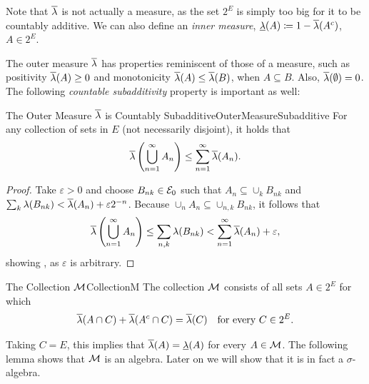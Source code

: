 Note that \(\overline{\lambda}\) is not actually a measure, as the set \(2^E\) is simply too big for it to be countably additive. We can also define an \textit{inner measure}, \(\underline{\lambda}(A) \coloneqq 1 - \overline{\lambda}(A^c)\), \(A \in 2^E\).

The outer measure \(\overline{\lambda}\) has properties reminiscent of those of a measure, such as positivity \(\overline{\lambda}(A) \ge 0\) and monotonicity \(\overline{\lambda}(A) \le \overline{\lambda}(B)\), when \(A \subseteq B\). Also, \(\overline{\lambda}(\emptyset) = 0\). The following \textit{countable subadditivity} property is important as well:

\begin{lem}{The Outer Measure \(\overline{\lambda}\) is Countably Subadditive}{OuterMeasureSubadditive}
	For any collection of sets in \(E\) (not necessarily disjoint), it holds that
	\begin{equation}
		\overline{\lambda}\left(\bigcup_{n=1}^\infty A_n\right) \le \sum_{n=1}^\infty \overline{\lambda}(A_n).
		\label{eq:OuterMeasureSubadditivity}
	\end{equation}
\end{lem}

\begin{proof}
	Take \(\varepsilon > 0\) and choose \(B_{nk} \in \mathcal{E}_0\) such that \(A_n \subseteq \cup_k B_{nk}\) and \(\sum_k \lambda(B_{nk}) < \overline{\lambda}(A_n) + \varepsilon 2^{-n}\). Because \(\cup_n A_n \subseteq \cup_{n,k} B_{nk}\), it follows that
	\begin{equation*}
		\overline{\lambda}\left(\bigcup_{n=1}^\infty A_n\right) \le \sum_{n,k} \lambda(B_{nk}) < \sum_{n=1}^\infty \overline{\lambda}(A_n) + \varepsilon,
	\end{equation*}
	showing , as \(\varepsilon\) is arbitrary.
\end{proof}

\begin{defn}{The Collection \(\mathcal{M}\)}{CollectionM}
	The collection \(\mathcal{M}\) consists of all sets \(A \in 2^E\) for which
	\begin{equation}
		\overline{\lambda}(A \cap C) + \overline{\lambda}(A^c \cap C) = \overline{\lambda}(C) \quad \text{for every } C \in 2^E.
		\label{eq:CaratheodoryCondition}
	\end{equation}
\end{defn}

Taking \(C=E\), this implies that \(\overline{\lambda}(A) = \underline{\lambda}(A)\) for every \(A \in \mathcal{M}\). The following lemma shows that \(\mathcal{M}\) is an algebra. Later on we will show that it is in fact a \(\sigma\)-algebra.

